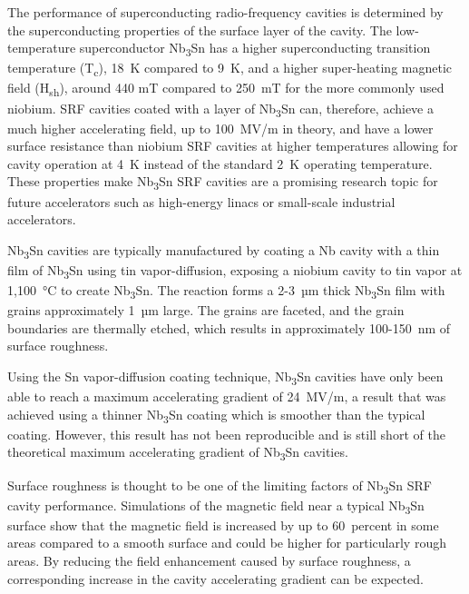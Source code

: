 \documentclass[reprint,amsmath,amssymb,aps]{revtex4-2}%
\begin{document}
The performance of superconducting radio-frequency cavities is determined by the superconducting properties of the surface layer of the cavity. The low-temperature superconductor Nb\textsubscript{3}Sn has a higher superconducting transition temperature (T\textsubscript{c}), 18~K compared to 9~K, and a higher super-heating magnetic field (H\textsubscript{sh}), around 440 mT compared to 250~mT for the more commonly used niobium\cite{liarte2017theoretical}. SRF cavities coated with a layer of Nb\textsubscript{3}Sn can, therefore, achieve a much higher accelerating field, up to 100~MV/m in theory, and have a lower surface resistance than niobium SRF cavities at higher temperatures allowing for cavity operation at 4~K instead of the standard 2~K operating temperature. These properties make Nb\textsubscript{3}Sn SRF cavities are a promising research topic for future accelerators such as high-energy linacs or small-scale industrial accelerators.

Nb\textsubscript{3}Sn cavities are typically manufactured by coating a Nb cavity with a thin film of Nb\textsubscript{3}Sn using tin vapor-diffusion, exposing a niobium cavity to tin vapor at 1,100~°C to create Nb\textsubscript{3}Sn. The reaction forms a 2-3~µm thick Nb\textsubscript{3}Sn film with grains approximately 1~µm large. The grains are faceted, and the grain boundaries are thermally etched, which results in approximately 100-150~nm of surface roughness. 

Using the Sn vapor-diffusion coating technique, Nb\textsubscript{3}Sn cavities have only been able to reach a maximum accelerating gradient of 24~MV/m\cite{posen2021advances}, a result that was achieved using a thinner Nb\textsubscript{3}Sn coating which is smoother than the typical coating. However, this result has not been reproducible and is still short of the theoretical maximum accelerating gradient of Nb\textsubscript{3}Sn cavities.

Surface roughness is thought to be one of the limiting factors of Nb\textsubscript{3}Sn SRF cavity performance. Simulations of the magnetic field near a typical Nb\textsubscript{3}Sn surface show that the magnetic field is increased by up to 60~percent in some areas compared to a smooth surface\cite{porter2016surface} and could be higher for particularly rough areas. By reducing the field enhancement caused by surface roughness, a corresponding increase in the cavity accelerating gradient can be expected. 
\end{document}
